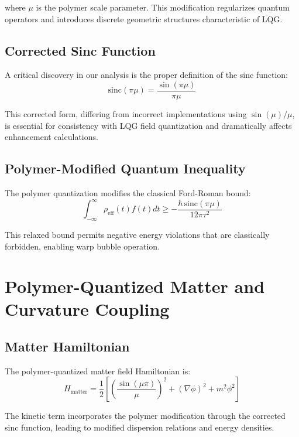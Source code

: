 \documentclass[11pt]{article}
\begin{document}
where $\mu$ is the polymer scale parameter. This modification regularizes quantum operators and introduces discrete geometric structures characteristic of LQG.

\subsection{Corrected Sinc Function}

A critical discovery in our analysis is the proper definition of the sinc function:
\begin{equation}
\boxed{\mathrm{sinc}(\pi\mu) = \frac{\sin(\pi\mu)}{\pi\mu}}
\end{equation}

This corrected form, differing from incorrect implementations using $\sin(\mu)/\mu$, is essential for consistency with LQG field quantization and dramatically affects enhancement calculations.

\subsection{Polymer-Modified Quantum Inequality}

The polymer quantization modifies the classical Ford-Roman bound:
\begin{equation}
\int_{-\infty}^{\infty} \rho_{\text{eff}}(t) f(t) dt \geq -\frac{\hbar\,\mathrm{sinc}(\pi\mu)}{12\pi\tau^2}
\end{equation}

This relaxed bound permits negative energy violations that are classically forbidden, enabling warp bubble operation.

\section{Polymer-Quantized Matter and Curvature Coupling}

\subsection{Matter Hamiltonian}

The polymer-quantized matter field Hamiltonian is:
\begin{equation}
H_{\text{matter}} = \frac{1}{2}\left[\left(\frac{\sin(\mu\pi)}{\mu}\right)^2 + (\nabla\phi)^2 + m^2\phi^2\right]
\end{equation}

The kinetic term incorporates the polymer modification through the corrected sinc function, leading to modified dispersion relations and energy densities.
\end{document}

